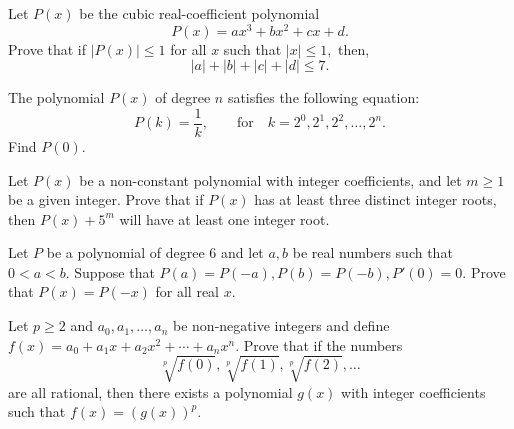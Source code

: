 \begin{question}[name={1996 IMO Shortlist}]
    Let $P(x)$ be the cubic real-coefficient polynomial \[P(x) = ax^3 + bx^2 + cx + d.\] Prove that if $ |P(x)| \leq 1$ for all $ x$ such that $ |x| \leq 1,$ then, \[ |a| + |b| + |c| + |d| \leq 7.\]
\end{question}


\begin{question}[name={1996 Poland}]
    The polynomial $P(x)$ of degree $n$ satisfies the following equation:
    \[P(k)=\frac{1}{k},\qquad \text{for} \quad k=2^0,2^1,2^2,\dots,2^n.\]
    Find $P(0)$.
\end{question}



\begin{question}[name={1996 Poland}]
    Let $P(x)$ be a non-constant polynomial with integer coefficients, and let $m \geq 1$ be a given integer. Prove that if $P(x)$ has at least three distinct integer roots, then $P(x)+5^m$ will have at least one integer root.
\end{question}

\begin{question}[name={1998 Baltic Way}]
    Let $P$ be a polynomial of degree $6$ and let $a,b$ be real numbers such that $0<a<b$. Suppose that $P(a)=P(-a),P(b)=P(-b),P'(0)=0$. Prove that $P(x)=P(-x)$ for all real $x$.	
\end{question}






\begin{question}[name={1995 UNESCO}]
    Let $p\geq 2$ and $a_0,a_1,\dots,a_n$ be non-negative integers and define $f(x)=a_0+a_1x+a_2x^2+\cdots+a_nx^n$. Prove that if the numbers 
    \[\sqrt[p]{f(0)}, \sqrt[p]{f(1)}, \sqrt[p]{f(2)}, \dots\]
    are all rational, then there exists a polynomial $g(x)$ with integer coefficients such that $f(x)=(g(x))^p$. 
\end{question}


